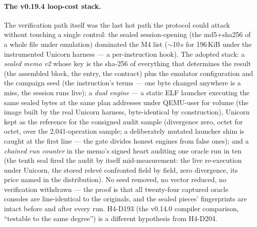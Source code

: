\documentclass[11pt,a4paper]{article}
\begin{document}
\paragraph{The v0.19.4 loop-cost stack.} The verification path itself
was the last hot path the protocol could attack without touching a
single control: the sealed session-opening (the md5+sha256 of a whole
file under emulation) dominated the M4 list ($\sim$10\,s for
196\,KiB under the instrumented Unicorn harness --- a per-instruction
hook). The adopted stack: a \emph{sealed memo v2} whose key is the
sha-256 of everything that determines the result (the assembled block,
the entry, the contract) plus the emulator configuration and the
campaign seed (the instruction's terms --- one byte changed anywhere is
a miss, the session runs live); a \emph{dual engine} --- a static ELF
launcher executing the same sealed bytes at the same plan addresses
under QEMU-user for volume (the image built by the real Unicorn harness,
byte-identical by construction), Unicorn kept as the reference for the
consigned audit sample (divergence zero, octet for octet, over the
2{,}041-operation sample; a deliberately mutated launcher shim is
caught at the first line --- the gate divides honest engines from false
ones); and a \emph{chained run counter} in the memo's signed heart
auditing one oracle run in ten (the tenth seal fired the audit by
itself mid-measurement: the live re-execution under Unicorn, the stored
relev\'e confronted field by field, zero divergence, its price named
in the distribution). No seed removed, no vector reduced, no
verification withdrawn --- the proof is that all twenty-four captured
oracle consoles are line-identical to the originals, and the sealed
pieces' fingerprints are intact before and after every run. H4-D193 (the
v0.14.0 compiler comparison, ``testable to the same degree'') is a
different hypothesis from H4-D204.
\end{document}
